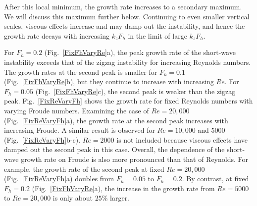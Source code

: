 After this local minimum, the growth rate increases to a secondary maximum. We will discuss this maximum further below. Continuing to even smaller vertical scales, viscous effects increase and may damp out the instability, and hence the growth rate decays with increasing $k_{z}F_{h}$ in the limit of large $k_{z}F_{h}$. 

For $F_{h}=0.2$ (Fig.~\ref{FixFhVaryRe}a), the peak growth rate of the short-wave instability exceeds that of the zigzag instability for increasing Reynolds numbers. The growth rates at the second peak is smaller for $F_{h}=0.1$ (Fig.~\ref{FixFhVaryRe}b), but they continue to increase with increasing $Re$. For $F_{h}=0.05$ (Fig.~\ref{FixFhVaryRe}c), the second peak is weaker than the zigzag peak. Fig.~\ref{FixReVaryFh} shows the growth rate for fixed Reynolds numbers with varying Froude numbers. Examining the case of $Re=20{,}000$ (Fig.~\ref{FixReVaryFh}a), the growth rate at the second peak increases with increasing Froude. A similar result is observed for $Re=10{,}000$ and $5000$ (Fig.~\ref{FixReVaryFh}b-c). $Re=2000$ is not included because viscous effects have damped out the second peak in this case. Overall, the dependence of the short-wave growth rate on Froude is also more pronounced than that of Reynolds. For example, the growth rate of the second peak at fixed $Re=20{,}000$ (Fig.~\ref{FixReVaryFh}a) doubles from $F_{h}=0.05$ to $F_{h}=0.2$. By contrast, at fixed $F_{h}=0.2$ (Fig.~\ref{FixFhVaryRe}a), the increase in the growth rate from $Re=5000$ to $Re=20{,}000$ is only about $25\%$ larger. 

